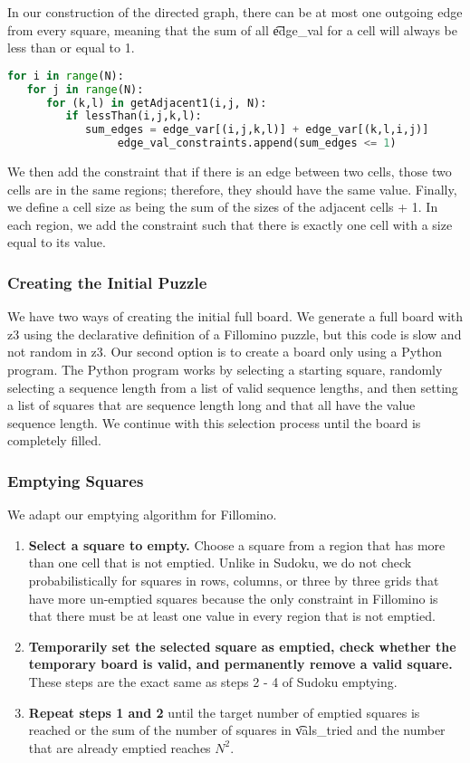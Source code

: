 In our construction of the directed graph, there can be at most one outgoing edge from every square, meaning that the sum of all \t{edge\_val} for a cell will always be less than or equal to 1.

\singlespace
\begin{lstlisting}[language=python, frame=single]
for i in range(N):
   for j in range(N):
      for (k,l) in getAdjacent1(i,j, N):
         if lessThan(i,j,k,l):
            sum_edges = edge_var[(i,j,k,l)] + edge_var[(k,l,i,j)]
                 edge_val_constraints.append(sum_edges <= 1)
\end{lstlisting}
\doublespace

We then add the constraint that if there is an edge between two cells,
those two cells are in the same regions; therefore, they should have
the same value. Finally, we define a cell size as being the sum of the
sizes of the adjacent cells + 1. In each region, we add the constraint
such that there is exactly one cell with a size equal to its value.

\subsubsection*{Creating the Initial Puzzle}
We have two ways of creating the initial full board. We generate a
full board with z3 using the declarative definition of a Fillomino
puzzle, but this code is slow and not random in z3. Our second option
is to create a board only using a Python program. The Python program works by
selecting a starting square, randomly selecting a sequence length from
a list of valid sequence lengths, and then setting a list of squares
that are sequence length long and that all have the value sequence
length. We continue with this selection process until the board is completely filled.


\subsubsection*{Emptying Squares}

We adapt our emptying algorithm for Fillomino.

\begin{enumerate}
\item {\bf Select a square to empty.} Choose a square from a region
  that has more than one cell that is not emptied. Unlike in Sudoku, we do not check probabilistically for squares in rows, columns, or three by three grids that have more un-emptied squares because the only constraint in Fillomino is that there must be at least one value in every region that is not emptied.
\item {\bf Temporarily set the selected square as emptied, check whether the temporary board is valid, and permanently remove a valid square.} These steps are the exact same as steps 2 - 4 of Sudoku emptying.
\item{\bf Repeat steps 1 and 2} until the target number of emptied squares is reached or the sum of the number of squares in \t{vals\_tried} and the number that are already emptied reaches $N^2$. 
\end{enumerate}

